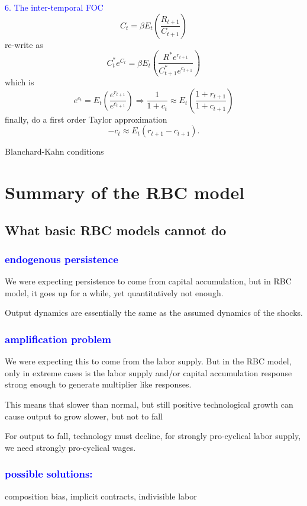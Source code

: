 \textcolor{blue}{6. The inter-temporal FOC}
$${C_t}=\beta E_t\left(\frac{R_{t+1}}{C_{t+1}}\right) $$
re-write as
$$C_t^*e^{C_t}=\beta E_t\left(\frac{R^*e^{r_{t+1}}}{C_{t+1}^*e^{c_{t+1}}}\right)$$
which is
$$e^{c_t}=E_t\left(\frac{e^{r_{t+1}}}{e^{c_{t+1}}}\right)\Rightarrow\frac1{1+c_t}\approx E_t\left(\frac{1+r_{t+1}}{1+c_{t+1}}\right)$$
finally, do a first order Taylor approximation
$$-c_t\approx E_t(r_{t+1}-c_{t+1}). $$

Blanchard-Kahn conditions


\section{Summary of the RBC model}

\subsection{What basic RBC models cannot do}

\subsubsection{\textcolor{blue}{endogenous persistence}}
We were expecting persistence to come from capital
accumulation, but in RBC model, it goes up for a while, yet quantitatively not enough.

Output dynamics are essentially the same as the assumed
dynamics of the shocks.

\subsubsection{\textcolor{blue}{amplification problem}}
We were expecting this to come from the labor supply. But in the RBC model, 
only in extreme cases is the labor supply and/or capital
accumulation response strong enough to generate multiplier
like responses. 

This means that slower than normal, but still positive
technological growth can cause output to grow slower, but not
to fall

For output to fall, technology must decline, for strongly pro-cyclical labor supply, 
we need strongly pro-cyclical wages.

\subsubsection{\textcolor{blue}{possible solutions:} }
composition bias, implicit contracts,
indivisible labor